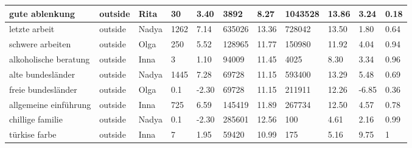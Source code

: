 \begin{longtable}{|p{3cm}|p{1cm}|p{1cm}|R{0.8cm}|R{0.8cm}|R{1.2cm}|R{1cm}|R{1.3cm}|R{1cm}|R{0.8cm}|R{0.6cm}|}
gute ablenkung                                                     & outside     & Rita      & 30                  & 3.40                      & 3892       & 8.27             & 1043528      & 13.86                 & 3.24  & 0.18                 \\ \hline
letzte arbeit                                                      & outside     & Nadya     & 1262                & 7.14                      & 635026     & 13.36            & 728042       & 13.50                 & 1.80  & 0.64                 \\ \hline
schwere arbeiten                                                   & outside     & Olga      & 250                 & 5.52                      & 128965     & 11.77            & 150980       & 11.92                 & 4.04  & 0.94                 \\ \hline
alkoholische beratung                                              & outside     & Inna      & 3                   & 1.10                      & 94009      & 11.45            & 4025         & 8.30                  & 3.34  & 0.96                 \\ \hline
alte bundesl\"{a}nder                                              & outside     & Nadya     & 1445                & 7.28                      & 69728      & 11.15            & 593400       & 13.29                 & 5.48  & 0.69                 \\ \hline
freie bundesl\"{a}nder                                             & outside     & Olga      & 0.1                 & -2.30                     & 69728      & 11.15            & 211911       & 12.26                 & -6.85 & 0.36                 \\ \hline
allgemeine einf\"{u}hrung                                          & outside     & Inna      & 725                 & 6.59                      & 145419     & 11.89            & 267734       & 12.50                 & 4.57  & 0.78                 \\ \hline
chillige familie                                                   & outside     & Nadya     & 0.1                 & -2.30                     & 285601     & 12.56            & 100          & 4.61                  & 2.16  & 0.99                 \\ \hline
t\"{u}rkise farbe                                                  & outside     & Inna      & 7                   & 1.95                      & 59420      & 10.99            & 175          & 5.16                  & 9.75  & 1                 \\ \hline

\end{longtable}
